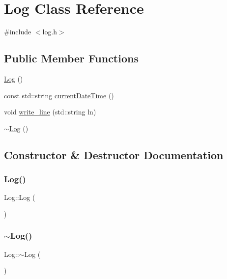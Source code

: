 \hypertarget{class_log}{}\section{Log Class Reference}
\label{class_log}


{\ttfamily \#include $<$log.\+h$>$}

\subsection*{Public Member Functions}
\begin{DoxyCompactItemize}
\item 
\mbox{\hyperlink{class_log_af6071a60aa52b6c1b511f99b4bc1b8fe}{Log}} ()
\item 
const std\+::string \mbox{\hyperlink{class_log_af056ba4ff9151d69bf1b302a95253c52}{current\+Date\+Time}} ()
\item 
void \mbox{\hyperlink{class_log_aeb1d174708785f8f763895ad8e41d580}{write\+\_\+line}} (std\+::string ln)
\item 
\mbox{\hyperlink{class_log_a0fbfda88fbee5027c89f6eb121059360}{$\sim$\+Log}} ()
\end{DoxyCompactItemize}


\subsection{Constructor \& Destructor Documentation}
\mbox{\label{class_log_af6071a60aa52b6c1b511f99b4bc1b8fe}} 
\subsubsection{\texorpdfstring{Log()}{Log()}}
{\footnotesize\ttfamily Log\+::\+Log (\begin{DoxyParamCaption}{ }\end{DoxyParamCaption})}

\mbox{\label{class_log_a0fbfda88fbee5027c89f6eb121059360}} 
\subsubsection{\texorpdfstring{$\sim$\+Log()}{~Log()}}
{\footnotesize\ttfamily Log\+::$\sim$\+Log (\begin{DoxyParamCaption}{ }\end{DoxyParamCaption})}



